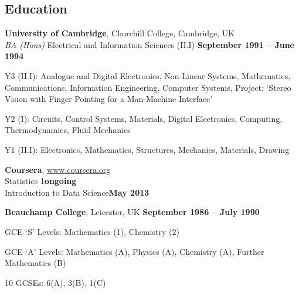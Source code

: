 \documentclass[margin = 0cm,line]{resume}
\begin{document}
\begin{resume}
    \section{\mysidestyle Education}

    \textbf{University of Cambridge}, Churchill College, Cambridge, UK \vspace{2mm}\\\vspace{1mm}%
    \textsl{BA (Hons)} Electrical and Information Sciences (II.I)\hfill \textbf{ September 1991 -- June 1994}\vspace{-3mm}\\\vspace{-1mm}%
    \begin{list2}
        \item Y3 (II.I): Analogue and Digital Electronics, Non-Linear Systems, 
            Mathematics, Communications, Information Engineering, Computer 
            Systems, Project: `Stereo Vision with Finger Pointing for a Man-Machine Interface'
        \item Y2 (I): Circuits, Control Systems, Materials, Digital Electronics, 
            Computing, Thermodynamics, Fluid Mechanics
        \item Y1 (II.I): Electronics, Mathematics, Structures, Mechanics, Materials,  Drawing
    \end{list2}\vspace{-1.5mm}

    \textbf{Coursera}, \url{www.coursera.org} \vspace{2mm}\\\vspace{1mm}%
    Statistics 1\hfill \textbf{ongoing}                                               \vspace{0.5mm}\\%
    Introduction to Data Science\hfill \textbf{May 2013}%

    \textbf{Beauchamp College}, Leicester, UK\hfill \textbf{ September 1986 -- July 1990}\vspace{-3mm}\\\vspace{-1mm}%
    \begin{list2}
        \item GCE `S' Levels: Mathematics (1), Chemistry (2)
        \item GCE `A' Levels: Mathematics (A), Physics (A), Chemistry (A), Further Mathematics (B)
        \item 10 GCSEs: 6(A), 3(B), 1(C)
    \end{list2}\vspace{-1.5mm}
 

\end{resume}
\end{document}
